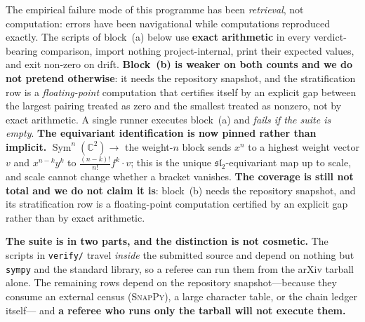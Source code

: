 \documentclass[11pt,reqno]{amsart}
\theoremstyle{plain}
\theoremstyle{definition}
\theoremstyle{remark}
\newcommand{\C}{\mathbb{C}}
\newcommand{\sll}{\mathfrak{sl}}
\newcommand{\Sym}{\operatorname{Sym}}
\begin{document}
The empirical failure mode of this programme has been \emph{retrieval}, not computation:
errors have been navigational while computations reproduced exactly. The scripts of
block~(a) below use \textbf{exact arithmetic} in every verdict-bearing comparison,
import nothing project-internal, print their expected values, and exit non-zero on
drift. \textbf{Block~(b) is weaker on both counts and we do not pretend otherwise}: it
needs the repository snapshot, and the stratification row is a \emph{floating-point}
computation that certifies itself by an explicit gap between the largest pairing treated
as zero and the smallest treated as nonzero, not by exact arithmetic. A single runner executes block~(a) and
\emph{fails if the suite is empty}. \textbf{The equivariant identification is now pinned rather than implicit.}
$\Sym^n(\C^2)\to$ the weight-$n$ block sends $x^n$ to a highest weight vector $v$ and
$x^{n-k}y^k$ to $\tfrac{(n-k)!}{n!}f^k\!\cdot\!v$; this is the unique $\sll_2$-equivariant
map up to scale, and scale cannot change whether a bracket vanishes.
\textbf{The coverage is still not total and we do not claim
it is}: block~(b) needs the repository snapshot, and its stratification row is a
floating-point computation certified by an explicit gap rather than by exact arithmetic.

\textbf{The suite is in two parts, and the distinction is not cosmetic.} The scripts in
\texttt{verify/} travel \emph{inside} the submitted source and depend on nothing but
\texttt{sympy} and the standard library, so a referee can run them from the arXiv tarball
alone. The remaining rows depend on the repository snapshot---because they consume an
external census (\textsc{SnapPy}), a large character table, or the chain ledger itself---
and \textbf{a referee who runs only the tarball will not execute them.}
\end{document}
